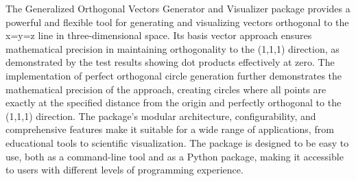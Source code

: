 The Generalized Orthogonal Vectors Generator and Visualizer package provides a powerful and flexible tool for generating and visualizing vectors orthogonal to the x=y=z line in three-dimensional space. Its basis vector approach ensures mathematical precision in maintaining orthogonality to the (1,1,1) direction, as demonstrated by the test results showing dot products effectively at zero. The implementation of perfect orthogonal circle generation further demonstrates the mathematical precision of the approach, creating circles where all points are exactly at the specified distance from the origin and perfectly orthogonal to the (1,1,1) direction. The package's modular architecture, configurability, and comprehensive features make it suitable for a wide range of applications, from educational tools to scientific visualization. The package is designed to be easy to use, both as a command-line tool and as a Python package, making it accessible to users with different levels of programming experience.
